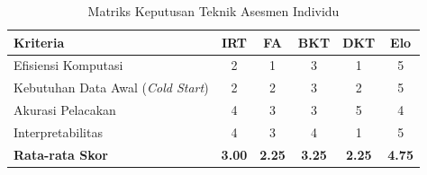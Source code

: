 \begin{table}[H]
    \centering
    \caption{Matriks Keputusan Teknik Asesmen Individu}
    \label{tbl:solusi-r1}
    \renewcommand{\arraystretch}{1.3} %
    \begin{tabular}{|p{4.0cm}|c|c|c|c|c|}
    \hline
    \textbf{Kriteria} & \textbf{IRT} & \textbf{FA} & \textbf{BKT} & \textbf{DKT} & \textbf{Elo} \\
    \hline
    Efisiensi Komputasi & 2 & 1 & 3 & 1 & 5 \\
    \hline
    Kebutuhan Data Awal (\textit{Cold Start}) & 2 & 2 & 3 & 2 & 5 \\
    \hline
    Akurasi Pelacakan & 4 & 3 & 3 & 5 & 4 \\
    \hline
    Interpretabilitas & 4 & 3 & 4 & 1 & 5 \\
    \hline
    \textbf{Rata-rata Skor} & \textbf{3.00} & \textbf{2.25} & \textbf{3.25} & \textbf{2.25} & \textbf{4.75} \\
    \hline
    \end{tabular}
\end{table}